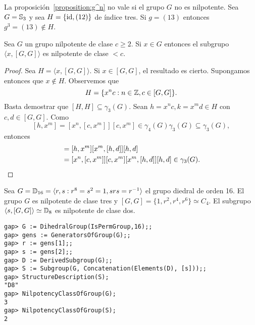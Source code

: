 \begin{example}
	La proposición~\ref{proposition:g^n} no vale si el grupo $G$ no es
	nilpotente. Sea $G=\mathbb{S}_3$ y sea $H=\{\operatorname{id},(12)\}$ de índice tres.  Si
	$g=(13)$ entonces $g^{3}=(13)\not\in H$.
\end{example}

\begin{lemma}
	\label{lemma:a[GG]}
	Sea $G$ un grupo nilpotente de clase $c\geq2$. Si $x\in G$ entonces el subgrupo 
	$\langle x,[G,G]\rangle$ es nilpotente de clase $<c$.
\end{lemma}

\begin{proof}
	Sea $H=\langle x,[G,G]\rangle$.  Si $x\in [G,G]$, el resultado es cierto.
	Supongamos entonces que $x\not\in H$. Observemos que 
	\[
		H=\{x^nc:n\in\mathbb{Z},c\in [G,G]\}.
	\]
	Basta demostrar que $[H,H]\subseteq\gamma_3(G)$. Sean $h=x^nc,k=x^md\in H$
	con $c,d\in [G,G]$. 
	Como 
	\[
	[h,x^m]=[x^n,[c,x^m]][c,x^m]\in\gamma_4(G)\gamma_3(G)\subseteq\gamma_3(G),
	\]
	entonces 
	\begin{align*}
		[h,k]&=[h,x^m][x^m,[h,d]][h,d]\\
			&=[x^n,[c,x^m]][c,x^m][x^m,[h,d]][h,d]\in\gamma_3(G).\qedhere
	\end{align*}
\end{proof}

\begin{example}
	Sea $G=\mathbb{D}_{16}=\langle r,s:r^{8}=s^2=1,srs=r^{-1}\rangle$ el grupo diedral
	de orden 16. El grupo $G$ es nilpotente de clase tres
	y $[G,G]=\{1,r^2,r^4,r^6\}\simeq C_4$. El subgrupo $\langle
	s,[G,G]\rangle\simeq\mathbb{D}_8$ es nilpotente de clase dos.

	\begin{lstlisting}
gap> G := DihedralGroup(IsPermGroup,16);;
gap> gens := GeneratorsOfGroup(G);;
gap> r := gens[1];;
gap> s := gens[2];;
gap> D := DerivedSubgroup(G);;
gap> S := Subgroup(G, Concatenation(Elements(D), [s]));;
gap> StructureDescription(S);
"D8"
gap> NilpotencyClassOfGroup(G);
3
gap> NilpotencyClassOfGroup(S);
2
	\end{lstlisting}
\end{example}

